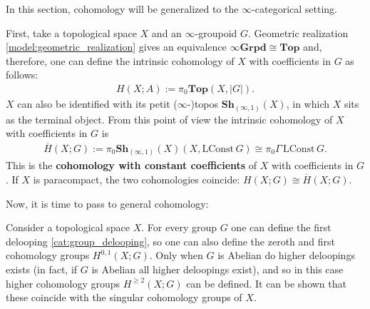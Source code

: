     In this section, cohomology will be generalized to the $\infty$-categorical setting.

    First, take a topological space $X$ and an $\infty$-groupoid $G$. Geometric realization \ref{model:geometric_realization} gives an equivalence $\infty\mathbf{Grpd}\cong\mathbf{Top}$ and, therefore, one can define the intrinsic cohomology of $X$ with coefficients in $G$ as follows:
    \begin{gather}
        H(X;A) := \pi_0\mathbf{Top}(X,|G|).
    \end{gather}
    $X$ can also be identified with its petit ($\infty$-)topos $\mathbf{Sh}_{(\infty,1)}(X)$, in which $X$ sits as the terminal object. From this point of view the intrinsic cohomology of $X$ with coefficients in $G$ is
    \begin{gather}
        \overline{H}(X;G) := \pi_0\mathbf{Sh}_{(\infty,1)}(X)(X,\mathrm{LConst}\,G)\cong\pi_0\Gamma\,\mathrm{LConst}\,G.
    \end{gather}
    This is the \textbf{cohomology with constant coefficients} of $X$ with coefficients in $G$. If $X$ is paracompact, the two cohomologies coincide: $H(X;G)\cong\overline{H}(X;G)$.

    Now, it is time to pass to general cohomology:
    \begin{example}
        Consider a topological space $X$. For every group $G$ one can define the first delooping \ref{cat:group_delooping}, so one can also define the zeroth and first cohomology groups $H^{0,1}(X;G)$. Only when $G$ is Abelian do higher deloopings exists (in fact, if $G$ is Abelian all higher deloopings exist), and so in this case higher cohomology groups $H^{\geq 2}(X;G)$ can be defined. It can be shown that these coincide with the singular cohomology groups of $X$.
    \end{example}


